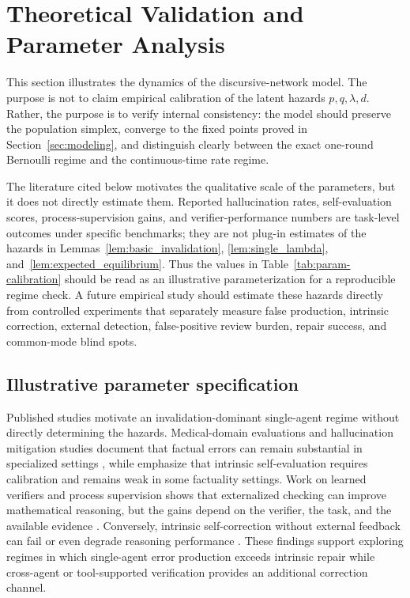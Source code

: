 \documentclass[12pt]{article}
\theoremstyle{definition}
\begin{document}
\section{Theoretical Validation and Parameter Analysis}
\label{sec:theoretical-validation}

This section illustrates the dynamics of the discursive-network
model.  The purpose is not to claim empirical calibration of the latent hazards
\(p,q,\lambda,d\).  Rather, the purpose is to verify internal consistency:
the model should preserve the population simplex, converge to the fixed points
proved in Section~\ref{sec:modeling}, and distinguish clearly between the exact
one-round Bernoulli regime and the continuous-time rate regime.

The literature cited below motivates the qualitative scale of the parameters,
but it does not directly estimate them.  Reported hallucination rates,
self-evaluation scores, process-supervision gains, and verifier-performance
numbers are task-level outcomes under specific benchmarks; they are not
plug-in estimates of the hazards in Lemmas~\ref{lem:basic_invalidation},
\ref{lem:single_lambda}, and~\ref{lem:expected_equilibrium}.  Thus the values in
Table~\ref{tab:param-calibration} should be read as an illustrative
parameterization for a reproducible regime check.  A future empirical study
should estimate these hazards directly from controlled experiments that
separately measure false production, intrinsic correction, external detection,
false-positive review burden, repair success, and common-mode blind spots.

\subsection{Illustrative parameter specification}
\label{sec:illustrative-parameters}

Published studies motivate an invalidation-dominant single-agent regime without
directly determining the hazards.  Medical-domain evaluations and hallucination
mitigation studies document that factual errors can remain substantial in
specialized settings \parencite{sallam2023chatgpt,thirunavukarasu2023large,Ji2023SelfReflection},
while \textcite{Zhang2024SelfAlignment} emphasize that intrinsic
self-evaluation requires calibration and remains weak in some factuality
settings.  Work on learned verifiers and process supervision shows that
externalized checking can improve mathematical reasoning, but the gains depend
on the verifier, the task, and the available evidence
\parencite{cobbe2021trainingverifiers,lightman2023verify}.  Conversely,
intrinsic self-correction without external feedback can fail or even degrade
reasoning performance \parencite{huang2023cannotselfcorrect}.  These findings
support exploring regimes in which single-agent error production exceeds
intrinsic repair while cross-agent or tool-supported verification provides an
additional correction channel.
\end{document}
